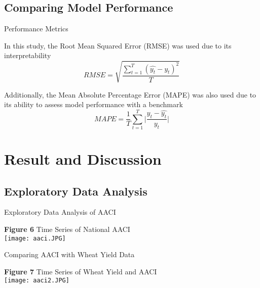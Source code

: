 \documentclass[aspectratio=169]{beamer}
\begin{document}
\subsection{Comparing Model Performance}
\begin{frame}{Performance Metrics}
\begin{item}
    \item In this study, the Root Mean Squared Error (RMSE) was used due to its interpretability
    \begin{equation}
        RMSE = \sqrt{\frac{\sum_{t=1}^{T} (\hat{y_{t}}-y_{t})^{2}}{T}}
    \end{equation}
    \item Additionally, the Mean Absolute Percentage Error (MAPE) was also used due to its ability to assess model performance with a benchmark
    \begin{equation}
        MAPE = \frac{1}{T}\sum_{t=1}^{T}\bigg|\frac{y_{t}-\hat{y_{t}}}{y_{t}}\bigg|
    \end{equation}
\end{item}
\end{frame}

\section{Result and Discussion}
\subsection{Exploratory Data Analysis}
\begin{frame}{Exploratory Data Analysis of AACI}
    \begin{center}
    \scriptsize{\textbf{Figure 6} Time Series of National AACI}\\
        \texttt{[image: aaci.JPG]}
    \end{center}
\end{frame}

\begin{frame}{Comparing AACI with Wheat Yield Data}
    \begin{center}
        \scriptsize{\textbf{Figure 7} Time Series of Wheat Yield and AACI}\\
        \texttt{[image: aaci2.JPG]}
    \end{center}
\end{frame}
\end{document}
